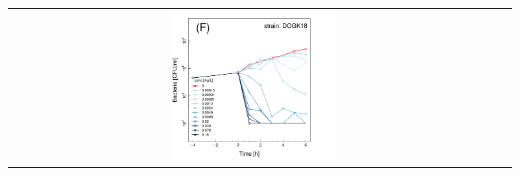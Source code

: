 \documentclass{article}
\begin{document}
\begin{center}
\begin{tabularx}{1\textwidth}{cc}
\includegraphics[trim = 0mm 0mm 0mm 0mm, clip,width=0.35\textwidth]{DOGK18_CIPregression}   \\
\end{tabularx}
\end{center}
\flushleft
\end{document}
